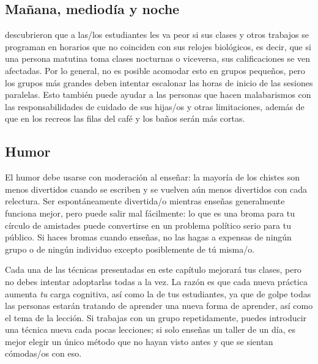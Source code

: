 \subsection*{Mañana, mediodía y noche}

\cite{Smar2018} descubrieron que
a las/los estudiantes les va peor
si sus clases y otros trabajos se programan en horarios que no coinciden con sus relojes biológicos,
es decir, que si una persona matutina toma clases nocturnas o viceversa,
sus calificaciones se ven afectadas.
Por lo general, no es posible acomodar esto en grupos pequeños,
pero los grupos más grandes deben intentar escalonar las horas de inicio de las sesiones paralelas.
Esto también puede ayudar a las personas que hacen malabarismos con las responsabilidades de cuidado de sus hijas/os y otras limitaciones,
además de que en los recreos las filas del café y los baños serán más cortas.

\subsection*{Humor}

El humor debe usarse con moderación al enseñar:
la mayoría de los chistes son menos divertidos cuando se escriben
y se vuelven aún menos divertidos con cada relectura.
Ser espontáneamente divertida/o mientras enseñas generalmente funciona mejor,
pero puede salir mal fácilmente:
lo que es una broma para tu círculo de amistades
puede convertirse en un problema político serio para tu público.
Si haces bromas cuando enseñas,
no las hagas a expensas de ningún grupo
o de ningún individuo excepto posiblemente de tú misma/o.


Cada una de las técnicas presentadas en este capítulo mejorará tus clases,
pero no debes intentar adoptarlas todas a la vez.
La razón es que cada nueva práctica aumenta \emph{tu} carga cognitiva, así como la de tus estudiantes,
ya que de golpe todas las personas estarán tratando de aprender una nueva forma de aprender,
así como el tema de la lección.
Si trabajas con un grupo repetidamente,
puedes introducir una técnica nueva cada pocas lecciones;
si solo enseñas un taller de un día,
es mejor elegir un único método que no hayan visto antes
y que se sientan cómodas/os con eso.



